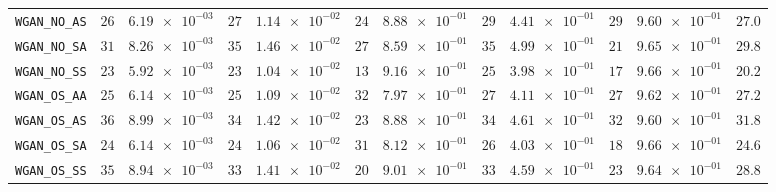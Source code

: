 \begin{xltabular}{\textwidth}{l||cC|cC|cC|cC|cC||c}
	\texttt{WGAN\_NO\_AS} & $ 26$ & $ \num{6.19e-03}$ & $ 27$ & $ \num{1.14e-02}$ & $ 24$ & $ \num{8.88e-01}$ & $ 29$ & $ \num{4.41e-01}$ & $ 29$ & $ \num{9.60e-01}$ & $ 27.0$  \\
	\texttt{WGAN\_NO\_SA} & $ 31$ & $ \num{8.26e-03}$ & $ 35$ & $ \num{1.46e-02}$ & $ 27$ & $ \num{8.59e-01}$ & $ 35$ & $ \num{4.99e-01}$ & $ 21$ & $ \num{9.65e-01}$ & $ 29.8$  \\
	\texttt{WGAN\_NO\_SS} & $ 23$ & $ \num{5.92e-03}$ & $ 23$ & $ \num{1.04e-02}$ & $ 13$ & $ \num{9.16e-01}$ & $ 25$ & $ \num{3.98e-01}$ & $ 17$ & $ \num{9.66e-01}$ & $ 20.2$  \\
	\texttt{WGAN\_OS\_AA} & $ 25$ & $ \num{6.14e-03}$ & $ 25$ & $ \num{1.09e-02}$ & $ 32$ & $ \num{7.97e-01}$ & $ 27$ & $ \num{4.11e-01}$ & $ 27$ & $ \num{9.62e-01}$ & $ 27.2$  \\
	\texttt{WGAN\_OS\_AS} & $ 36$ & $ \num{8.99e-03}$ & $ 34$ & $ \num{1.42e-02}$ & $ 23$ & $ \num{8.88e-01}$ & $ 34$ & $ \num{4.61e-01}$ & $ 32$ & $ \num{9.60e-01}$ & $ 31.8$  \\
	\texttt{WGAN\_OS\_SA} & $ 24$ & $ \num{6.14e-03}$ & $ 24$ & $ \num{1.06e-02}$ & $ 31$ & $ \num{8.12e-01}$ & $ 26$ & $ \num{4.03e-01}$ & $ 18$ & $ \num{9.66e-01}$ & $ 24.6$  \\
	\texttt{WGAN\_OS\_SS} & $ 35$ & $ \num{8.94e-03}$ & $ 33$ & $ \num{1.41e-02}$ & $ 20$ & $ \num{9.01e-01}$ & $ 33$ & $ \num{4.59e-01}$ & $ 23$ & $ \num{9.64e-01}$ & $ 28.8$  \\

\end{xltabular}
